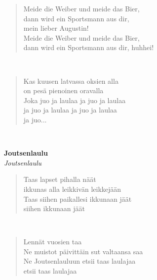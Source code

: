 \noindent\begin{minipage}{\linewidth}
\begin{verse}
	Meide die Weiber und meide das Bier,\\
	dann wird ein Sportsmann aus dir,\\
	mein lieber Augustin!\\
	Meide die Weiber und meide das Bier,\\
	dann wird ein Sportsmann aus dir, huhhei!\\
\end{verse}
\end{minipage}\\[10pt]
\noindent\begin{minipage}{\linewidth}
\begin{verse}
	Kas kuusen latvassa oksien alla\\
	on pesä pienoinen oravalla\\
	Joka juo ja laulaa ja juo ja laulaa\\
	ja juo ja laulaa ja juo ja laulaa\\
	ja juo...\\
\end{verse}
\end{minipage}\\[10pt]
%
%
\noindent\begin{minipage}{\linewidth}
\vspace{5pt}
\parbox[t]{0.85\linewidth}{\raggedright {\large\bf Joutsenlaulu}\\[2pt]\small\emph{Joutsenlaulu}\\[6pt]}
\begin{verse}
	
	Taas lapset pihalla näät\\
	ikkunas alla leikkivän leikkejään\\
	Taas siihen paikallesi ikkunaan jäät\\
	siihen ikkunaan jäät\\
\end{verse}
\end{minipage}\\[10pt]
\noindent\begin{minipage}{\linewidth}
\begin{verse}
	Lennät vuosien taa\\
	Ne muistot päivittäin sut valtaansa saa\\
	Ne Joutsenlauluun etsii taas laulajaa\\
	etsii taas laulajaa\\
\end{verse}
\end{minipage}\\[10pt]

